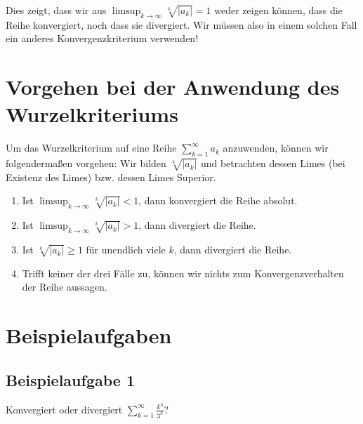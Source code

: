 \documentclass[fontsize=9pt,
               parskip=half-,
               DIV=14,
               listof=chapterentry,
               tocflat]{scrbook}
\begin{document}
Dies zeigt, dass wir aus $\limsup _{k\to \infty }{\sqrt[{k}]{|a_{k}|}}=1$ weder zeigen können, dass die Reihe konvergiert, noch dass sie divergiert. Wir müssen also in einem solchen Fall ein anderes Konvergenzkriterium verwenden!

\section{Vorgehen bei der Anwendung des Wurzelkriteriums}

Um das Wurzelkriterium auf eine Reihe $\sum _{k=1}^{\infty }a_{k}$ anzuwenden, können wir folgendermaßen vorgehen: Wir bilden ${\sqrt[{k}]{|a_{k}|}}$ und betrachten dessen Limes (bei Existenz des Limes) bzw. dessen Limes Superior.

\begin{enumerate}
\item Ist $\limsup _{k\to \infty }{\sqrt[{k}]{|a_{k}|}}<1$, dann konvergiert die Reihe absolut.
\item Ist $\limsup _{k\to \infty }{\sqrt[{k}]{|a_{k}|}}>1$, dann divergiert die Reihe.
\item Ist ${\sqrt[{k}]{|a_{k}|}}\geq 1$ für unendlich viele $k$, dann divergiert die Reihe.
\item Trifft keiner der drei Fälle zu, können wir nichts zum Konvergenzverhalten der Reihe aussagen.
\end{enumerate}

\section{Beispielaufgaben}

\subsection{Beispielaufgabe 1}

\begin{exercise*}
Konvergiert oder divergiert $\sum _{k=1}^{\infty }{\frac {k^{3}}{3^{k}}}$?

\end{exercise*}
\end{document}
